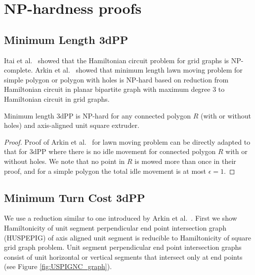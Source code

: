 \section{NP-hardness proofs}

\subsection{Minimum Length 3dPP}
Itai et al.~\cite{ItPaSz1982} showed that the Hamiltonian circuit problem for grid graphs is NP-complete.
Arkin et al.~\cite{ArFeMi2000} showed that minimum length lawn moving problem for simple polygon or polygon with holes is NP-hard based on reduction from Hamiltonian circuit in planar bipartite graph with maximum degree 3 to Hamiltonian circuit in grid graphs.

\begin{thm} 
  Minimum length 3dPP is NP-hard for any connected polygon $R$ (with or without holes) and axis-aligned unit square extruder. 	
\end{thm}
\begin{proof}
  Proof of Arkin et al.~\cite{ArFeMi2000} for lawn moving problem can be directly adapted to that for 3dPP where there is no idle movement for connected polygon $R$ with or without holes.
  We note that no point in $R$ is mowed more than once in their proof, and for a simple polygon the total idle movement is at most $\epsilon=1$.    
\end{proof}

 
\subsection{Minimum Turn Cost 3dPP}

We use a reduction similar to one introduced by Arkin et al.~\cite{ArBeDeFeMiSe2005}.
First we show Hamiltonicity of unit segment perpendicular end point intersection graph (HUSPEPIG) of axis aligned unit segment is reducible to Hamiltonicity of square grid graph problem.
Unit segment perpendicular end point intersection graphs consist of unit horizontal or vertical segments that intersect only at end points (see Figure \ref{fig:USPIGNC_graph}).

